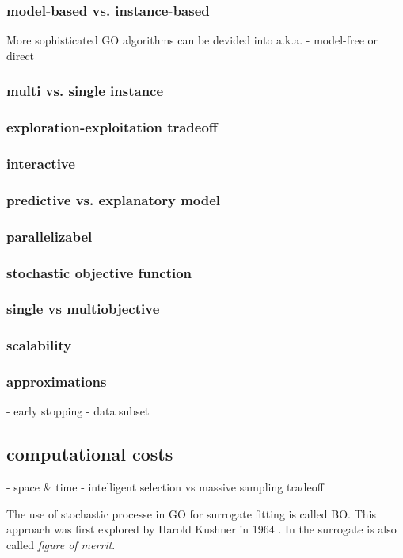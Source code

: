 \documentclass[english]{article}
\begin{document}
\subsubsection*{model-based vs. instance-based}
More sophisticated \ac{GO} algorithms can be devided into
a.k.a. - model-free or direct

\subsubsection*{multi vs. single instance}
\subsubsection*{exploration-exploitation tradeoff}
\subsubsection*{interactive}
\subsubsection*{predictive vs. explanatory model}
\subsubsection*{parallelizabel}
\subsubsection*{stochastic objective function}
\subsubsection*{single vs multiobjective}
\subsubsection*{scalability}
\subsubsection*{approximations}
 - early stopping
 - data subset

 \subsection*{computational costs}
 - space \& time
 - intelligent selection vs massive sampling tradeoff


The use of stochastic processe in \ac{GO} for surrogate fitting is called \ac{BO}. This approach was first explored by Harold Kushner in 1964 \cite{kushner_new_1964}. In \cite{jones_efficient_1998} the surrogate is also called \textit{figure of merrit}.
\end{document}
